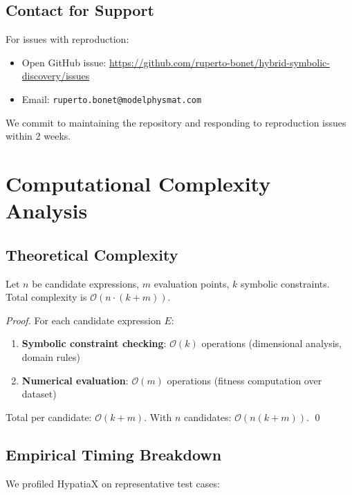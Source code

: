 \subsection{Contact for Support}

For issues with reproduction:
\begin{itemize}
\item Open GitHub issue: \url{https://github.com/ruperto-bonet/hybrid-symbolic-discovery/issues}
\item Email: \texttt{ruperto.bonet@modelphysmat.com}
\end{itemize}

We commit to maintaining the repository and responding to reproduction issues within 2 weeks.

\section{Computational Complexity Analysis}
\label{app:complexity}

\subsection{Theoretical Complexity}

\begin{proposition}
Let $n$ be candidate expressions, $m$ evaluation points, $k$ symbolic constraints. Total complexity is $\mathcal{O}(n \cdot (k + m))$.
\end{proposition}

\begin{proof}
For each candidate expression $E$:
\begin{enumerate}
\item \textbf{Symbolic constraint checking}: $\mathcal{O}(k)$ operations (dimensional analysis, domain rules)
\item \textbf{Numerical evaluation}: $\mathcal{O}(m)$ operations (fitness computation over dataset)
\end{enumerate}

Total per candidate: $\mathcal{O}(k + m)$. With $n$ candidates: $\mathcal{O}(n(k + m))$. \qed
\end{proof}

\subsection{Empirical Timing Breakdown}

We profiled HypatiaX on representative test cases:

